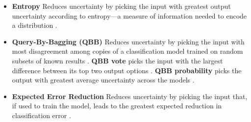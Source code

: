 \documentclass{sig-alternate}
\begin{document}
\begin{itemize}
%
\item \textbf{Entropy} Reduces uncertainty by picking the input with greatest output uncertainty according to entropy---a measure of information needed to encode a distribution \cite{settles2012:al-book}.
%
\item \textbf{Query-By-Bagging (QBB)} Reduces uncertainty by picking the input with most disagreement among copies of a classification model trained on random subsets of known results \cite{settles2012:al-book}.
\textbf{QBB vote} picks the input with the largest difference between its top two output options \cite{settles2012:al-book}.
\textbf{QBB probability} picks the output with greatest average uncertainty across the models \cite{abe1998:qbb}.
%
\item \textbf{Expected Error Reduction} Reduces uncertainty by picking the input that, if used to train the model, leads to the greatest expected reduction in classification error \cite{settles2012:al-book}.

\end{itemize}
\end{document}
